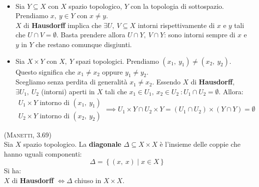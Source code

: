 \begin{demonstration}~{}
	\begin{itemize}
		\item Sia $Y\subseteq X$ con $X$ spazio topologico, $Y$ con la topologia di sottospazio. Prendiamo $x,\ y\in Y$ con $x\neq y$.\\
		$X$ di \textbf{Hausdorff} implica che $\exists U,\ V\subseteq X$ intorni rispettivamente di $x$ e $y$ tali che $U\cap V=\emptyset$. Basta prendere allora $U\cap Y,\ V\cap Y$: sono intorni sempre di $x$ e $y$ in $Y$ che restano comunque disgiunti.
		\item Sia $X\times Y$ con $X,\ Y$ spazi topologici. Prendiamo $\left(x_1,\ y_1\right)\neq\left(x_2,\ y_2\right)$. Questo significa che $x_1\neq x_2$ oppure $y_1\neq y_2$.\\ Scegliamo senza perdita di generalità $x_1\neq x_2$. Essendo $X$ di \textbf{Hausdorff}, $\exists U_1,\ U_2$ (intorni) aperti in $X$  tali che $x_1\in U_1,\ x_2\in U_2\ \colon U_1\cap U_2=\emptyset$. Allora:
		\begin{equation*}
			\begin{array}{l}
				U_1\times Y\text{ intorno di }\left(x_1,\ y_1\right)\\
				U_2\times Y\text{ intorno di }\left(x_2,\ y_2\right)
			\end{array}
			\implies U_1\times Y\cap U_2\times Y=\left(U_1\cap U_2\right)\times\left(Y\cap Y\right)=\emptyset 
		\end{equation*}
	\end{itemize}
\end{demonstration}
\begin{theorema}\textsc{(Manetti, 3.69)}\\
	Sia $X$ spazio topologico. La \textbf{diagonale} $\Delta\subseteq X\times X$ è l'insieme delle coppie che hanno uguali componenti:
	\begin{equation}
		\Delta=\left\{\left(x,\ x\right)\mid x\in X\right\}
	\end{equation}
	Si ha:\\
	$X$ di \textbf{Hausdorff} $\iff \Delta$ chiuso in $X\times X$.
\end{theorema}
